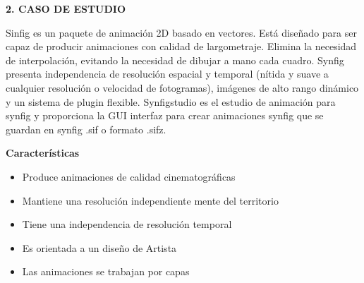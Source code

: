 \documentclass[10pt,a4paper]{article}
\begin{document}
\vspace{\baselineskip}
\vspace{\baselineskip}
\textbf{2. CASO DE ESTUDIO}
\vspace{\baselineskip}

Sinfig es un paquete de animación 2D basado en vectores. Está diseñado para ser capaz de producir animaciones con calidad de largometraje. Elimina la necesidad de interpolación, evitando la necesidad de dibujar a mano cada cuadro. Synfig presenta independencia de resolución espacial y temporal (nítida y suave a cualquier resolución o velocidad de fotogramas), imágenes de alto rango dinámico y un sistema de plugin flexible. Synfigstudio es el estudio de animación para synfig y proporciona la GUI interfaz para crear animaciones synfig que se guardan en synfig .sif o formato .sifz.
\vspace{\baselineskip}

\textbf{Características}

\begin{itemize}
\item Produce animaciones de calidad cinematográficas 
\item Mantiene una resolución independiente mente del territorio
\item Tiene una independencia de resolución temporal 
\item Es orientada a un diseño de Artista
\item Las animaciones se trabajan por capas 

\end{itemize}
\end{document}
